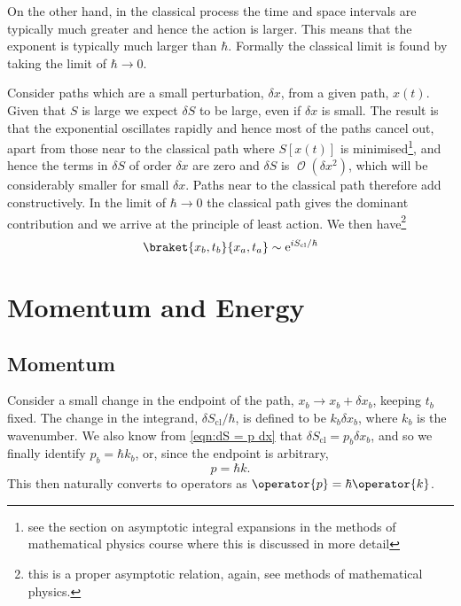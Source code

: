 \documentclass[fleqn]{NotesClass}
\newcommand*{\e}{\mathrm{e}}
\newcommand*{\order}{\mathop{\mathcal{O}}}
\newcommand*{\cl}{\mathrm{cl}}
\begin{document}
    On the other hand, in the classical process the time and space intervals are typically much greater and hence the action is larger.
    This means that the exponent is typically much larger than \(\hbar\).
    Formally the classical limit is found by taking the limit of \(\hbar \to 0\).
    
    Consider paths which are a small perturbation, \(\delta x\), from a given path, \(x(t)\).
    Given that \(S\) is large we expect \(\delta S\) to be large, even if \(\delta x\) is small.
    The result is that the exponential oscillates rapidly and hence most of the paths cancel out, apart from those near to the classical path where \(S[x(t)]\) is minimised\footnote{see the section on asymptotic integral expansions in the methods of mathematical physics course where this is discussed in more detail}, and hence the terms in \(\delta S\) of order \(\delta x\) are zero and \(\delta S\) is \(\order(\delta x^2)\), which will be considerably smaller for small \(\delta x\).
    Paths near to the classical path therefore add constructively.
    In the limit of \(\hbar \to 0\) the classical path gives the dominant contribution and we arrive at the principle of least action.
    We then have\footnote{this is a proper asymptotic relation, again, see methods of mathematical physics.}
    \begin{equation}
        \braket{x_b, t_b}{x_a, t_a} \sim \e^{i S_{\cl}/\hbar}
    \end{equation}
    
    \section{Momentum and Energy}
    \subsection{Momentum}
    Consider a small change in the endpoint of the path, \(x_b \to x_b + \delta x_b\), keeping \(t_b\) fixed.
    The change in the integrand, \(\delta S_{\cl}/\hbar\), is defined to be \(k_b\delta x_b\), where \(k_b\) is the wavenumber.
    We also know from \cref{eqn:dS = p dx} that \(\delta S_{\cl} = p_b\delta x_b\), and so we finally identify \(p_b = \hbar k_b\), or, since the endpoint is arbitrary,
    \begin{equation}
        p = \hbar k.
    \end{equation}
    This then naturally converts to operators as \(\operator{p} = \hbar \operator{k}\).
    
\end{document}

